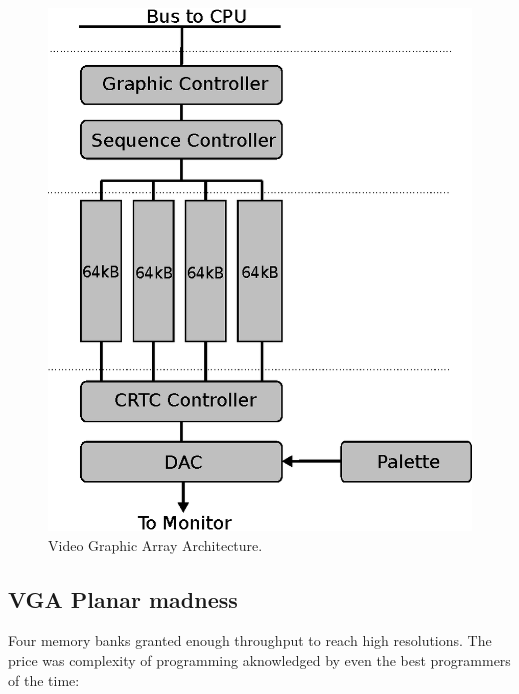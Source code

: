 \documentclass[book.tex]{subfiles}
\begin{document}
\begin{figure}[H]
\centering
\includegraphics[width=\textwidth]{imgs/vga.eps}
\caption{Video Graphic Array Architecture.}
\label{fig:vga_arch}
\end{figure}




\subsection{VGA Planar madness}

Four memory banks granted enough throughput to reach high resolutions. The price was complexity of programming aknowledged by even the best programmers of the time:\\
\end{document}
